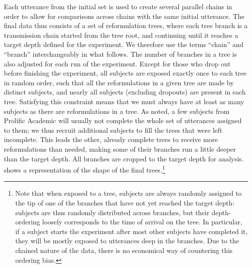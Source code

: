 \documentclass[a4paper,fleqn]{cas-dc}
\begin{document}
Each utterance from the initial set is used to create several parallel
chains in order to allow for comparisons across chains with the same
initial utterance. The final data thus consists of a set of
reformulation trees, where each tree branch is a transmission chain
started from the tree root, and continuing until it reaches a target
depth defined for the experiment. We therefore use the terms
  \enquote{chain} and \enquote{branch} interchangeably in what follows.
The number of branches in a tree is also adjusted for each run of the
experiment. Except for those who drop out before finishing the
experiment, all subjects are exposed exactly once to each tree in random
order, such that all the reformulations in a given tree are made by
distinct subjects, and nearly all subjects (excluding dropouts) are
present in each tree. Satisfying this constraint means that we must
always have at least as many subjects as there are reformulations in a
tree. As noted, a few subjects from Prolific Academic will usually not
complete the whole set of utterances assigned to them; we thus recruit
additional subjects to fill the trees that were left incomplete. This
leads the other, already complete trees to receive more reformulations
than needed, making some of their branches run a little deeper than the
target depth. All branches are cropped to the target depth for analysis.
shows a representation of the shape of the final trees.\footnote{Note that when exposed to a tree, subjects are always randomly
assigned to the tip of one of the branches that have not yet reached the
target depth: subjects are thus randomly distributed across branches,
but their depth-ordering loosely corresponds to the time of arrival on
the tree. In particular, if a subject starts the experiment after most
other subjects have completed it, they will be mostly exposed to
utterances deep in the branches. Due to the chained nature of the data,
there is no economical way of countering this ordering bias.}

\end{document}
